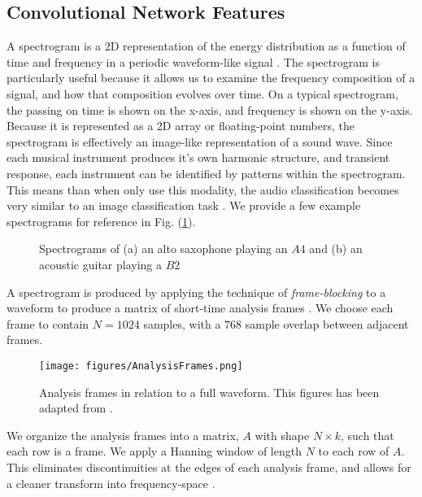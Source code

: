 \documentclass[conference,twocolumn,letterpaper]{IEEEtran}
\begin{document}

\subsection{Convolutional Network Features}
\label{subsec:Features}

A spectrogram is a 2D representation of the energy distribution as a function of time and frequency in a periodic waveform-like signal \cite{Virtanen}. The spectrogram is particularly useful because it allows us to examine the frequency composition of a signal, and how that composition evolves over time. On a typical spectrogram, the passing on time is shown on the x-axis, and frequency is shown on the y-axis. Because it is represented as a 2D array or floating-point numbers, the spectrogram is effectively an image-like representation of a sound wave. Since each musical instrument produces it's own harmonic structure, and transient response, each instrument can be identified by patterns within the spectrogram. This means than when only use this modality, the audio classification becomes very similar to an image classification task \cite{Ngiam}. We provide a few example spectrograms for reference in Fig. (\ref{fig:Example Spectrograms}).

\begin{figure}[h]
    \centering
    \caption{Spectrograms of (a) an alto saxophone playing an $A4$ and (b) an acoustic guitar playing a $B2$}
    \label{fig:Example Spectrograms}
\end{figure}

A spectrogram is produced by applying the technique of \textit{frame-blocking} to a waveform to produce a matrix of short-time analysis frames \cite{Liu,Virtanen}. We choose each frame to contain $N = 1024$ samples, with a $768$ sample overlap between adjacent frames. 
\begin{figure}[h]
    \centering
    \texttt{[image: figures/AnalysisFrames.png]}
    \caption{Analysis frames in relation to a full waveform. This figures has been adapted from \cite{Liu}.}
    \label{fig:AnalysisFrames}
\end{figure}
We organize the analysis frames into a matrix, $A$ with shape $N \times k$, such that each row is a frame. We apply a Hanning window of length $N$ to each row of $A$. This eliminates discontinuities at the edges of each analysis frame, and allows for a cleaner transform into frequency-space \cite{Virtanen}. 
\end{document}
